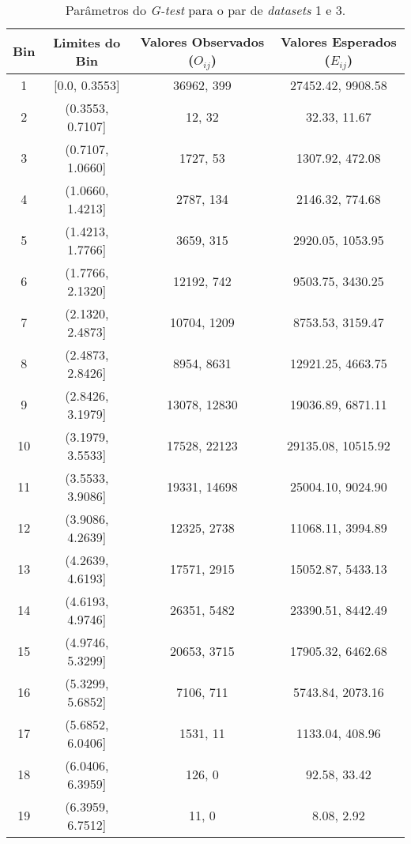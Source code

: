 \begin{table}[H]
    \centering
    \caption{Parâmetros do \textit{G-test} para o par de \textit{datasets} 1 e 3.}
    \label{tab:g_test_parameters_13}
    \begin{tabular}{|c|c|c|c|}
    \hline
    \textbf{Bin} & \textbf{Limites do Bin} & \textbf{Valores Observados ($O_{ij}$)} & \textbf{Valores Esperados ($E_{ij}$)} \\ \hline
    1  & [0.0, 0.3553]      & 36962, 399       & 27452.42, 9908.58       \\ \hline
    2  & (0.3553, 0.7107]   & 12, 32           & 32.33, 11.67            \\ \hline
    3  & (0.7107, 1.0660]   & 1727, 53         & 1307.92, 472.08         \\ \hline
    4  & (1.0660, 1.4213]   & 2787, 134        & 2146.32, 774.68         \\ \hline
    5  & (1.4213, 1.7766]   & 3659, 315        & 2920.05, 1053.95        \\ \hline
    6  & (1.7766, 2.1320]   & 12192, 742       & 9503.75, 3430.25        \\ \hline
    7  & (2.1320, 2.4873]   & 10704, 1209      & 8753.53, 3159.47        \\ \hline
    8  & (2.4873, 2.8426]   & 8954, 8631       & 12921.25, 4663.75       \\ \hline
    9  & (2.8426, 3.1979]   & 13078, 12830     & 19036.89, 6871.11       \\ \hline
    10 & (3.1979, 3.5533]   & 17528, 22123     & 29135.08, 10515.92      \\ \hline
    11 & (3.5533, 3.9086]   & 19331, 14698     & 25004.10, 9024.90       \\ \hline
    12 & (3.9086, 4.2639]   & 12325, 2738      & 11068.11, 3994.89       \\ \hline
    13 & (4.2639, 4.6193]   & 17571, 2915      & 15052.87, 5433.13       \\ \hline
    14 & (4.6193, 4.9746]   & 26351, 5482      & 23390.51, 8442.49       \\ \hline
    15 & (4.9746, 5.3299]   & 20653, 3715      & 17905.32, 6462.68       \\ \hline
    16 & (5.3299, 5.6852]   & 7106, 711        & 5743.84, 2073.16        \\ \hline
    17 & (5.6852, 6.0406]   & 1531, 11         & 1133.04, 408.96         \\ \hline
    18 & (6.0406, 6.3959]   & 126, 0       & 92.58, 33.42            \\ \hline
    19 & (6.3959, 6.7512]   & 11, 0        & 8.08, 2.92              \\ \hline
    \end{tabular}
\end{table}

